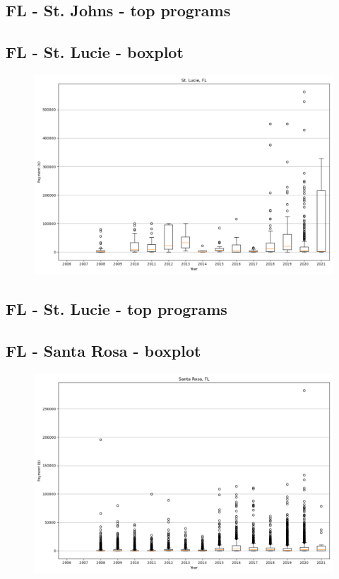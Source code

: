 \subsection*{FL - St. Johns - top programs}

\newpage
\subsection*{FL - St. Lucie - boxplot}
\begin{figure}[h]
\centering
\includegraphics[width=7in]{../output/boxplots/counties/St. Lucie-FL_boxplot.png}
\end{figure}


\subsection*{FL - St. Lucie - top programs}

\newpage
\subsection*{FL - Santa Rosa - boxplot}
\begin{figure}[h]
\centering
\includegraphics[width=7in]{../output/boxplots/counties/Santa Rosa-FL_boxplot.png}
\end{figure}


